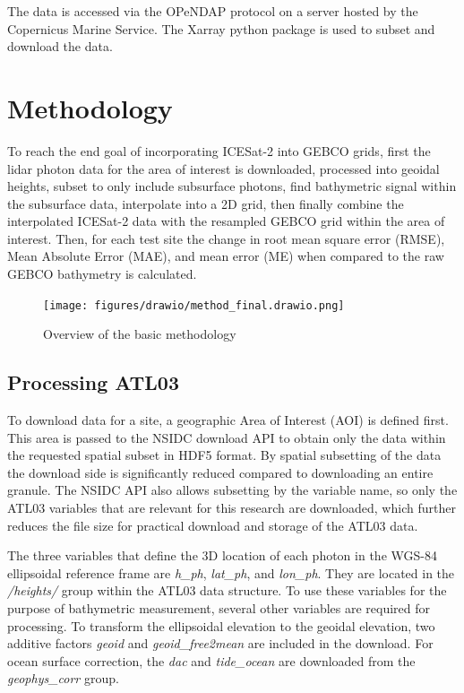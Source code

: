The data is accessed via the OPeNDAP protocol on a server hosted by the Copernicus Marine Service. The Xarray python package \parencite{hoyer_stephan_2022_6323468,hoyer2017xarray} is used to subset and download the data.



\section{Methodology}

To reach the end goal of incorporating ICESat-2 into GEBCO grids, first the lidar photon data for the area of interest is downloaded, processed into geoidal heights, subset to only include subsurface photons, find bathymetric signal within the subsurface data, interpolate into a 2D grid, then finally combine the interpolated ICESat-2 data with the resampled GEBCO grid within the area of interest. Then, for each test site the change in root mean square error (RMSE), Mean Absolute Error (MAE), and mean error (ME) when compared to  the raw GEBCO bathymetry is calculated. 

\begin{figure}[h]
    \centering
    \texttt{[image: figures/drawio/method\_final.drawio.png]}
    \caption{Overview of the basic methodology}
    \label{fig:methodology-overview}
\end{figure}

\subsection{Processing ATL03}

To download data for a site, a geographic Area of Interest (AOI) is defined first. This area is passed to the NSIDC download API to obtain only the data within the requested spatial subset in HDF5 format. By spatial subsetting of the data the download side is significantly reduced compared to downloading an entire granule. The NSIDC API also allows subsetting by the variable name, so only the ATL03 variables that are relevant for this research are downloaded, which further reduces the file size for practical download and storage of the ATL03 data. 

The three variables that define the 3D location of each photon in the WGS-84 ellipsoidal reference frame are \emph{h\_ph}, \emph{lat\_ph}, and \emph{lon\_ph}. They are located in the \emph{/heights/} group within the ATL03 data structure. To use these variables for the purpose of bathymetric measurement, several other variables are required for processing. To transform the ellipsoidal elevation to the geoidal elevation, two additive factors \emph{geoid} and \emph{geoid\_free2mean} are included in the download. For ocean surface correction, the \emph{dac} and \emph{tide\_ocean} are downloaded from the \emph{geophys\_corr} group.

